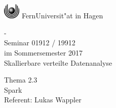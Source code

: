 \thispagestyle{empty}
\begin{center}
\begin{huge}
\vspace*{3cm}
   \begin{minipage}{\textwidth}
     \vspace*{\fill}
    \begin{center}
       \includegraphics[width=0.8cm]{./logo/logo.eps} FernUniversit"at in Hagen
    \end{center}
     \vfill
   \end{minipage}
   -\\
   Seminar 01912 / 19912 \\
   im Sommersemester 2017 \\[2em]
   \glqq{}Skallierbare verteilte Datenanalyse\grqq{} \\[2cm]
\end{huge}
\begin{large}
   Thema 2.3\\[1em]
   Spark\\[3cm]
   Referent: Lukas Wappler
\end{large}

\end{center}